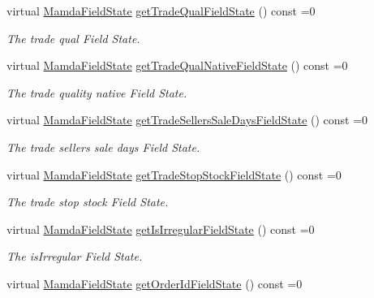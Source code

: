 \begin{CompactItemize}
virtual \hyperlink{namespaceWombat_93aac974f2ab713554fd12a1fa3b7d2a}{Mamda\-Field\-State} \hyperlink{classWombat_1_1MamdaTradeReport_902afe48248ed43e56d481ba755888b6}{get\-Trade\-Qual\-Field\-State} () const =0
\begin{CompactList}\small\item\em The trade qual Field State. \item\end{CompactList}\item 
virtual \hyperlink{namespaceWombat_93aac974f2ab713554fd12a1fa3b7d2a}{Mamda\-Field\-State} \hyperlink{classWombat_1_1MamdaTradeReport_871557683cafde19e08e1a2e5c6f1f42}{get\-Trade\-Qual\-Native\-Field\-State} () const =0
\begin{CompactList}\small\item\em The trade quality native Field State. \item\end{CompactList}\item 
virtual \hyperlink{namespaceWombat_93aac974f2ab713554fd12a1fa3b7d2a}{Mamda\-Field\-State} \hyperlink{classWombat_1_1MamdaTradeReport_da39a0b22fe34276bbf3fb4eefe510d3}{get\-Trade\-Sellers\-Sale\-Days\-Field\-State} () const =0
\begin{CompactList}\small\item\em The trade sellers sale days Field State. \item\end{CompactList}\item 
virtual \hyperlink{namespaceWombat_93aac974f2ab713554fd12a1fa3b7d2a}{Mamda\-Field\-State} \hyperlink{classWombat_1_1MamdaTradeReport_cca5c5f38da9a0a129b2c8b386ead49b}{get\-Trade\-Stop\-Stock\-Field\-State} () const =0
\begin{CompactList}\small\item\em The trade stop stock Field State. \item\end{CompactList}\item 
virtual \hyperlink{namespaceWombat_93aac974f2ab713554fd12a1fa3b7d2a}{Mamda\-Field\-State} \hyperlink{classWombat_1_1MamdaTradeReport_69578220fbe3f7892865d86384d35b4b}{get\-Is\-Irregular\-Field\-State} () const =0
\begin{CompactList}\small\item\em The is\-Irregular Field State. \item\end{CompactList}\item 
virtual \hyperlink{namespaceWombat_93aac974f2ab713554fd12a1fa3b7d2a}{Mamda\-Field\-State} \hyperlink{classWombat_1_1MamdaTradeReport_544b8f3a730cfc1553bdc756372cd12b}{get\-Order\-Id\-Field\-State} () const =0

\end{CompactItemize}
